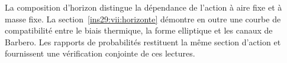 La composition d’horizon distingue la dépendance de l’action à aire
fixe et à masse fixe. La section~\ref{ins29:vii:horizonte} démontre en outre
une courbe de compatibilité entre le biais thermique, la forme elliptique et les
canaux de Barbero. Les rapports de probabilités restituent la même
section d’action et fournissent une vérification conjointe de ces lectures.

